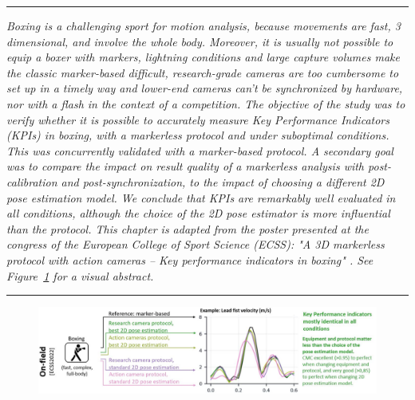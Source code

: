 \begin{center}
\rule{0.7\linewidth}{.5pt}
\begin{minipage}{0.7\linewidth}
\smallskip

\textit{Boxing is a challenging sport for motion analysis, because movements are fast, 3 dimensional, and involve the whole body. Moreover, it is usually not possible to equip a boxer with markers, lightning conditions and large capture volumes make the classic marker-based difficult, research-grade cameras are too cumbersome to set up in a timely way and lower-end cameras can't be synchronized by hardware, nor with a flash in the context of a competition.\newline\newline
The objective of the study was to verify whether it is possible to accurately measure Key Performance Indicators (KPIs) in boxing, with a markerless protocol and under suboptimal conditions. This was concurrently validated with a marker-based protocol. A secondary goal was to compare the impact on result quality of a markerless analysis with post-calibration and post-synchronization, to the impact of choosing a different 2D pose estimation model. We conclude that KPIs are remarkably well evaluated in all conditions, although the choice of the 2D pose estimator is more influential than the protocol.\newline \newline
This chapter is adapted from the poster presented at the congress of the European College of Sport Science (ECSS): "A 3D markerless protocol with action cameras – Key performance indicators in boxing" \cite{Pagnon2022c}. See Figure~\ref{fig_visabstract4} for a visual abstract.
}

\end{minipage}
\smallskip
\rule{0.7\linewidth}{.5pt}
\end{center}

\clearpage

\minitoc

\vspace*{3cm}

\begin{figure}[hbtp]
	\centering
      \captionsetup{justification=centering}
	\def\svgwidth{1\columnwidth}
	\fontsize{10pt}{10pt}\selectfont
	\includegraphics[width=\linewidth]{"../Intro/Figures/Fig_VisAbstract4.JPG"}
	\label{fig_visabstract4}
\end{figure}


